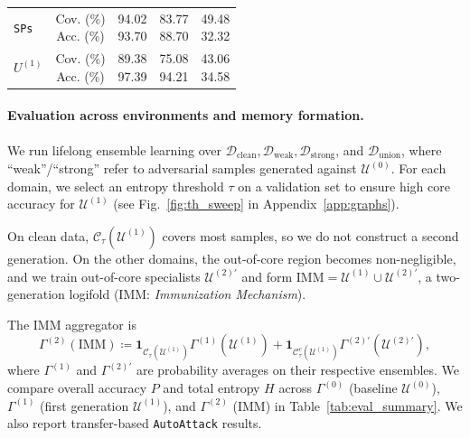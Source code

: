 \documentclass{article}
\theoremstyle{plain}
\theoremstyle{definition}
\theoremstyle{remark}
\newcommand{\cU}{\mathcal{U}}
\newcommand{\IMM}{\mathrm{IMM}}
\newcommand{\cC}{\mathcal{C}}
\newcommand{\cD}{\mathcal{D}}
\begin{document}
\begin{table}[t]
{\begin{tabular}{lcccc}
			\texttt{SPs}&\makecell{Cov. (\%) \\ Acc. (\%)}&
			\makecell[c]{94.02 \\ 93.70} &
			\makecell[c]{83.77 \\ 88.70 } &
			\makecell[c]{49.48 \\ 32.32 } \\
			
			$U^{(1)}$&\makecell{Cov. (\%) \\ Acc. (\%)}&
			\makecell[c]{89.38 \\ 97.39 } &
			\makecell[c]{75.08\\ 94.21 } &
			\makecell[c]{43.06\\ 34.58 } \\
			\bottomrule
	\end{tabular}}
	
\end{table}

\paragraph{Evaluation across environments and memory formation.}
We run lifelong ensemble learning over $\cD_{\mathrm{clean}}, \cD_{\mathrm{weak}}, \cD_{\mathrm{strong}}$, and $\cD_{\mathrm{union}}$, where ``weak''/``strong'' refer to adversarial samples generated against $\cU^{(0)}$. 
For each domain, we select an entropy threshold $\tau$ on a validation set to ensure high core accuracy for $\cU^{(1)}$ (see Fig.~\ref{fig:th_sweep} in Appendix~\ref{app:graphs}).


On clean data, $\cC_\tau(\cU^{(1)})$ covers most samples, so we do not construct a second generation.
On the other domains, the out-of-core region becomes non-negligible, and we train out-of-core specialists $\cU^{(2)'}$ and form $\IMM=\cU^{(1)}\cup\cU^{(2)'}$, a two-generation logifold (IMM: \emph{Immunization Mechanism}).

The $\IMM$ aggregator is
\begin{equation}
	\Gamma^{(2)}(\IMM)\coloneqq 
	\mathbf{1}_{\cC_\tau(\cU^{(1)})}\Gamma^{(1)}(\cU^{(1)})
	+\mathbf{1}_{\cC_\tau^c(\cU^{(1)})}\Gamma^{(2)'}(\cU^{(2)'}),
\end{equation}
where $\Gamma^{(1)}$ and $\Gamma^{(2)'}$ are probability averages on their respective ensembles.
We compare overall accuracy $P$ and total entropy $H$ across $\Gamma^{(0)}$ (baseline $\cU^{(0)}$), $\Gamma^{(1)}$ (first generation $\cU^{(1)}$), and $\Gamma^{(2)}$ ($\IMM$) in Table~\ref{tab:eval_summary}.
We also report transfer-based \texttt{AutoAttack} results.
\end{document}
